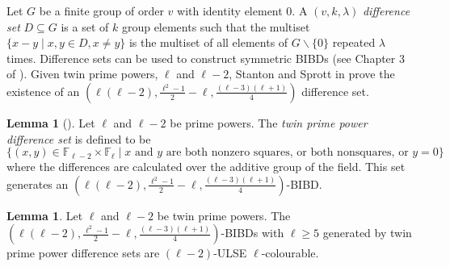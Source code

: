 \documentclass[12pt]{article}
\theoremstyle{definition}
\newtheorem{lemma}[theorem]{Lemma}
\begin{document}
Let $G$ be a finite group of order $v$ with identity element $0$. A $(v,k,\lambda)$ \emph{difference set} $D\subseteq G$ is a set of $k$ group elements such that the multiset $\{x-y \mid x,y\in D, x\neq y\}$ is the multiset of all elements of $G\backslash \{0\}$ repeated $\lambda$ times. Difference sets can be used to construct symmetric BIBDs (see Chapter 3 of \cite{S04}). Given twin prime powers, $\ell$ and $\ell - 2$, Stanton and Sprott in \cite{SS58} prove the existence of an $\left(\ell(\ell - 2), \frac{\ell^2 - 1}{2} - \ell, \frac{(\ell - 3)(\ell +1)}{4}\right)$ difference set.

\begin{lemma}[\cite{SS58}]\label{lem: twin prime power difference set}
    Let $\ell$ and $\ell - 2$ be prime powers. The \emph{twin prime power difference set} is defined to be \[\{ (x,y) \in \mathbb{F}_{\ell -2}\times \mathbb{F}_{\ell} \mid \text{$x$ and $y$ are both nonzero squares, or both nonsquares, or $y=0$} \}\] where the differences are calculated over the additive group of the field. This set generates an $\left(\ell(\ell - 2), \frac{\ell^2 - 1}{2} - \ell, \frac{(\ell - 3)(\ell +1)}{4}\right)$-BIBD.
\end{lemma}

\begin{lemma}\label{lem: l-2 SE l coloured twin prime power difference BIBDs}
    Let $\ell$ and $\ell - 2$ be twin prime powers. The $\left(\ell(\ell - 2), \frac{\ell^2 - 1}{2} - \ell, \frac{(\ell - 3)(\ell +1)}{4}\right)$-BIBDs with $\ell \geq 5$ generated by twin prime power difference sets are $(\ell-2)$-ULSE $\ell$-colourable.
\end{lemma}
\end{document}
